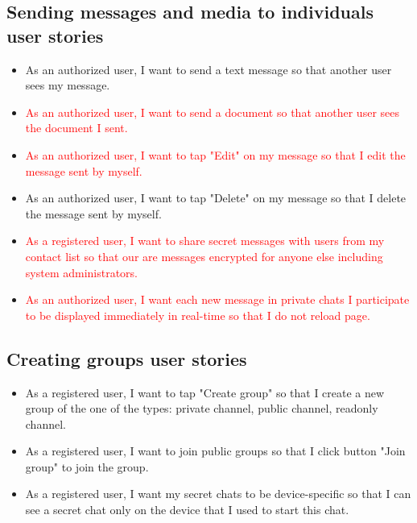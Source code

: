 \subsection{Sending messages and media to individuals user stories}
\label{subsec:sending-messages-and-media-feature-user-stories}
\begin{itemize}
    \item As an authorized user, I want to send a text message so that another user sees my message.
    \item \textcolor{red}{As an authorized user, I want to send a document so that another user sees the document I sent.}
    \item \textcolor{red}{As an authorized user, I want to tap "Edit" on my message so that I edit the message sent by myself.}
    \item As an authorized user, I want to tap "Delete" on my message so that I delete the message sent by myself.
    \item \textcolor{red}{As a registered user, I want to share secret messages with users from my contact list so that our are
    messages encrypted for anyone else including system administrators.}
    \item \textcolor{red}{As an authorized user, I want each new message in private chats I participate to be displayed immediately in real-time so that I do not reload page.}
\end{itemize}

\subsection{Creating groups user stories}\label{subsec:creating-groups-feature-user-stories}
\begin{itemize}
    \item As a registered user, I want to tap "Create group" so that I create a new group of the one of the types: private channel, public channel, readonly channel.
    \item As a registered user, I want to join public groups so that I click button "Join group" to join the group.
    \item As a registered user, I want my secret chats to be device-specific so that I can see a secret chat only on the device that I used to start this chat.
\end{itemize}

